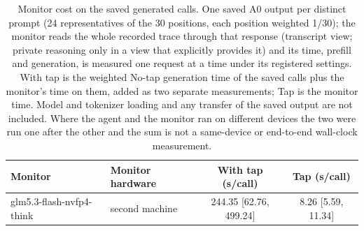\begin{table}[t]
\centering\footnotesize
\begin{tabular}{llcc}
\toprule
Monitor & Monitor hardware & With tap (s/call) & Tap (s/call) \\
\midrule
glm5.3-flash-nvfp4-think & second machine & 244.35 [62.76, 499.24] & 8.26 [5.59, 11.34] \\
\bottomrule
\end{tabular}
\caption{Monitor cost on the saved generated calls. One saved A0 output per distinct prompt (24 representatives of the 30 positions, each position weighted 1/30); the monitor reads the whole recorded trace through that response (transcript view; private reasoning only in a view that explicitly provides it) and its time, prefill and generation, is measured one request at a time under its registered settings. With tap is the weighted No-tap generation time of the saved calls plus the monitor's time on them, added as two separate measurements; Tap is the monitor time. Model and tokenizer loading and any transfer of the saved output are not included. Where the agent and the monitor ran on different devices the two were run one after the other and the sum is not a same-device or end-to-end wall-clock measurement.}
\end{table}
